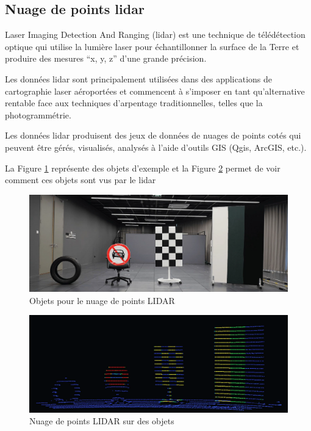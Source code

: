 \newpage
\subsection{Nuage de points \gls{lidar}}

Laser Imaging Detection And Ranging (\gls{lidar}) \cite{esri_quoi_2025} est une technique de télédétection optique qui utilise la lumière laser pour échantillonner la surface de la Terre et produire des mesures ``x, y, z'' d'une grande précision.

Les données \gls{lidar} sont principalement utilisées dans des applications de cartographie laser aéroportées et commencent à s'imposer en tant qu'alternative rentable face aux techniques d'arpentage traditionnelles, telles que la photogrammétrie.

Les données \gls{lidar} produisent des jeux de données de nuages de points cotés qui peuvent être gérés, visualisés, analysés à l'aide d'outils GIS (Qgis, ArcGIS, etc.).

La Figure \ref{fig:A1_15_lidar_exemple} représente des objets d'exemple et la Figure \ref{fig:A1_16_lidar_exemple2} permet de voir comment ces objets sont vus par le \gls{lidar}

\begin{figure}[H]
    \centering
    \includegraphics[width=1\linewidth]{03-tail//A1_fondamentaux_ML//A1_figures/A1_15_lidar_exemple1.png}
    \caption{Objets pour le nuage de points LIDAR \cite{cadden_lidar_2021}}
    \label{fig:A1_15_lidar_exemple}
\end{figure}

\begin{figure}[H]
    \centering
    \includegraphics[width=1\linewidth]{03-tail//A1_fondamentaux_ML//A1_figures/A1_16_lidar_exemple2.png}
    \caption{Nuage de points LIDAR sur des objets \cite{cadden_lidar_2021}}
    \label{fig:A1_16_lidar_exemple2}
\end{figure}

